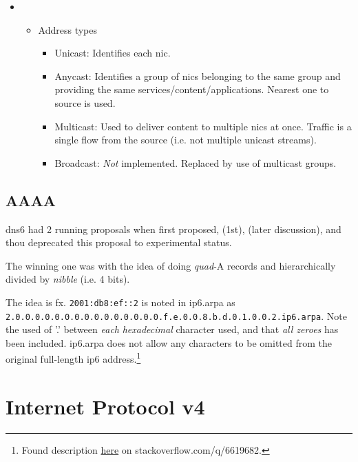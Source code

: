 \begin{itemize}
\begin{itemize}
\begin{itemize}
{        \end{itemize}
    \end{itemize}
    \item {}
    \begin{itemize}
        \item Address types
        \begin{itemize}
            \item Unicast: Identifies each \gls{nic}.
            \item Anycast: Identifies a group of \glspl{nic} belonging to the same group and providing the same services/content/applications. Nearest one to source is used.
            \item Multicast: Used to deliver content to multiple \glspl{nic} at once. Traffic is a single flow from the source (i.e. not multiple unicast streams).
            \item Broadcast: \textit{Not} implemented. Replaced by use of multicast groups.
        \end{itemize}
    \end{itemize}
\end{itemize}

\subsection{AAAA}

\gls{dns6} had 2 running proposals when first proposed,  (1st),  (later discussion), and  thou deprecated this proposal to experimental status.

The winning one was  with the idea of doing \textit{quad}-A records and hierarchically divided by \textit{nibble} {\small (i.e. 4 bits)}.

The idea is fx. \texttt{2001:db8:ef::2} is noted in ip6.arpa as \texttt{2.0.0.0.0.0.0.0.0.0.0.0.0.0.0.0.f.e.0.0.8.b.d.0.1.0.0.2.ip6.arpa}. {\small Note the used of '.' between \textit{each} \textit{hexadecimal} character used, and that \textit{all zeroes} has been included. ip6.arpa does not allow any characters to be omitted from the original full-length \gls{ip6} address.}\footnote{Found description \href{https://stackoverflow.com/q/6619682}{here} on stackoverflow.com/q/6619682.}

\section[IPv4]{Internet Protocol v4}
